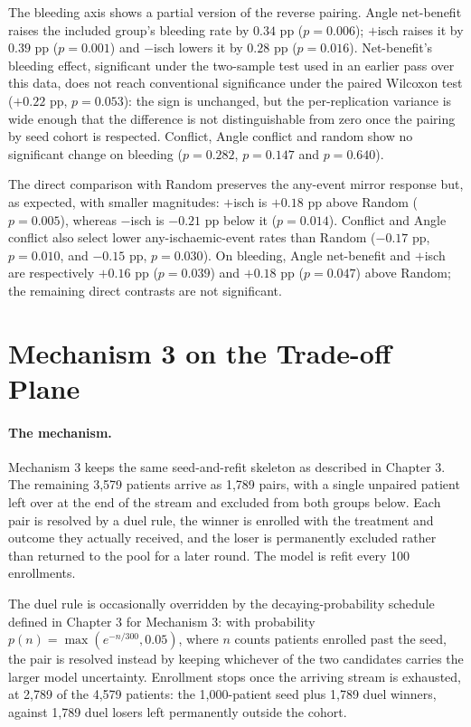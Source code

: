 \vspace{10pt}

The bleeding axis shows a partial version of the reverse pairing. Angle net-benefit
raises the included group's bleeding rate by $0.34$ pp ($p=0.006$); $+$isch raises it by
$0.39$ pp ($p=0.001$) and $-$isch lowers it by $0.28$ pp ($p=0.016$). Net-benefit's
bleeding effect, significant under the two-sample test used in an earlier pass over
this data, does not reach conventional significance under the paired Wilcoxon test
($+0.22$ pp, $p=0.053$): the sign is unchanged, but the per-replication variance is
wide enough that the difference is not distinguishable from zero once the pairing by
seed cohort is respected. Conflict, Angle conflict and random show no significant change
on bleeding ($p=0.282$, $p=0.147$ and $p=0.640$).

The direct comparison with Random preserves the any-event mirror response but, as expected,
with smaller magnitudes: $+$isch is $+0.18$ pp above Random ($p=0.005$), whereas $-$isch is
$-0.21$ pp below it ($p=0.014$). Conflict and Angle conflict also select lower
any-ischaemic-event rates than Random ($-0.17$ pp, $p=0.010$, and $-0.15$ pp,
$p=0.030$). On bleeding, Angle net-benefit and $+$isch are respectively $+0.16$ pp
($p=0.039$) and $+0.18$ pp ($p=0.047$) above Random; the remaining direct contrasts
are not significant.

\section{Mechanism 3 on the Trade-off Plane}

\paragraph{The mechanism.}
Mechanism 3 keeps the same seed-and-refit skeleton as described in Chapter 3.
The remaining 3,579 patients arrive as 1,789 pairs,
with a single unpaired patient left over at the end of the stream and excluded from both
groups below. Each pair is resolved by a duel rule, the winner is enrolled with the
treatment and outcome they actually received, and the loser is permanently excluded
rather than returned to the pool for a later round. The model is refit every 100
enrollments.

\vspace{10pt}

The duel rule is occasionally overridden by the decaying-probability schedule defined in
Chapter 3 for Mechanism 3: with probability $p(n) = \max(e^{-n/300}, 0.05)$, where $n$
counts patients enrolled past the seed, the pair is resolved instead by keeping whichever
of the two candidates carries the larger model uncertainty. Enrollment stops once the
arriving stream is exhausted, at 2,789 of the 4,579 patients: the 1,000-patient seed plus
1,789 duel winners, against 1,789 duel losers left permanently outside the cohort.

